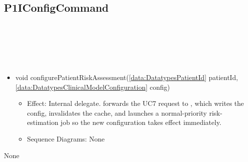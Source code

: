   \subsection{P1IConfigCommand}\label{int:InterfacesP1IConfigCommand}
    \begin{description}
      \item[Provided by:] \iconcomponent{}~
      \item[Required by:] \iconcomponent{}~ 
      \item[Operations:] ~
    \begin{itemize}[noitemsep,nolistsep,leftmargin=-.25cm]
      \item \textsf{void configurePatientRiskAssessment(\ref{data:DatatypesPatientId} patientId, \ref{data:DatatypesClinicalModelConfiguration} config)}
        \begin{itemize}[noitemsep,nolistsep]
           \item Effect: Internal delegate.  forwards the UC7 request to , which writes the config, invalidates the cache, and launches a normal-priority risk-estimation job so the new configuration takes effect immediately. 
           \item Sequence Diagrams: None
        \end{itemize}
    \end{itemize}
      \item[Diagrams:] None
    \end{description}

